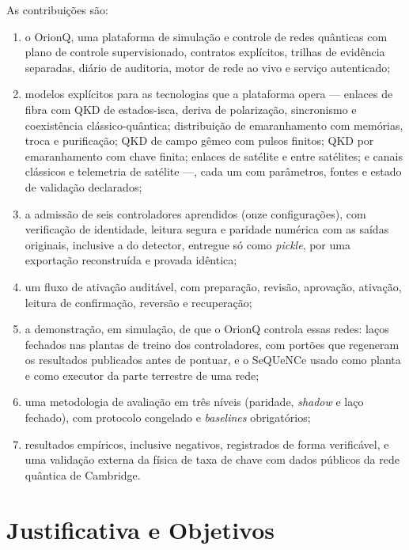 \documentclass[12pt]{article}
\begin{document}
As contribuições são:
\begin{enumerate}
  \item o OrionQ, uma plataforma de simulação e controle de redes quânticas com
        plano de controle supervisionado, contratos explícitos, trilhas de
        evidência separadas, diário de auditoria, motor de rede ao vivo e
        serviço autenticado;
  \item modelos explícitos para as tecnologias que a plataforma opera ---
        enlaces de fibra com QKD de estados-isca, deriva de polarização,
        sincronismo e coexistência clássico-quântica; distribuição de
        emaranhamento com memórias, troca e purificação; QKD de campo gêmeo com
        pulsos finitos; QKD por emaranhamento com chave finita; enlaces de
        satélite e entre satélites; e canais clássicos e telemetria de satélite
        ---, cada um com parâmetros, fontes e estado de validação declarados;
  \item a admissão de seis controladores aprendidos (onze configurações), com
        verificação de identidade, leitura segura e paridade numérica com as
        saídas originais, inclusive a do detector, entregue só como
        \textit{pickle}, por uma exportação reconstruída e provada idêntica;
  \item um fluxo de ativação auditável, com preparação, revisão, aprovação,
        ativação, leitura de confirmação, reversão e recuperação;
  \item a demonstração, em simulação, de que o OrionQ controla essas redes:
        laços fechados nas plantas de treino dos controladores, com portões que
        regeneram os resultados publicados antes de pontuar, e o SeQUeNCe usado
        como planta e como executor da parte terrestre de uma rede;
  \item uma metodologia de avaliação em três níveis (paridade, \textit{shadow} e
        laço fechado), com protocolo congelado e \textit{baselines}
        obrigatórios;
  \item resultados empíricos, inclusive negativos, registrados de forma
        verificável, e uma validação externa da física de taxa de chave com
        dados públicos da rede quântica de Cambridge.
\end{enumerate}

\section{Justificativa e Objetivos}
\end{document}
